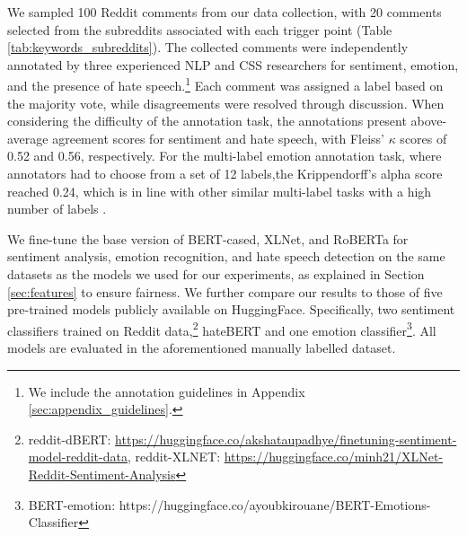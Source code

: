 We sampled 100 Reddit comments from our data collection, with 20 comments selected from the subreddits associated with each trigger point (Table \ref{tab:keywords_subreddits}). %
The collected comments were independently annotated by three experienced NLP and CSS researchers for sentiment, emotion, and the presence of hate speech.\footnote{We include the annotation guidelines in Appendix \ref{sec:appendix_guidelines}.} Each comment was assigned a label based on the majority vote, while disagreements were resolved through discussion. When considering the difficulty of the annotation task, the annotations present above-average agreement scores for sentiment and hate speech, with Fleiss' $\kappa$ scores of 0.52 and 0.56, respectively. For the multi-label emotion annotation task, where annotators had to choose from a set of 12 labels,the Krippendorff’s alpha score \cite{krippendorff2011computing} reached 0.24, which is in line with other similar multi-label tasks with a high number of labels \cite{mohammad2018semeval,antypas2022twitter,ousidhoum-etal-2019-multilingual}.

We fine-tune the base version of BERT-cased, XLNet, and RoBERTa for sentiment analysis, emotion recognition, and hate speech detection on the same datasets as the models we used for our experiments, as explained in Section \ref{sec:features} \cite{rosenthal2017semeval,mohammad2018semeval,antypas2023robust} to ensure fairness.
We further compare our results to those of five pre-trained models publicly available on HuggingFace. Specifically, two sentiment classifiers trained on Reddit data,\footnote{ reddit-dBERT: \url{https://huggingface.co/akshataupadhye/finetuning-sentiment-model-reddit-data}, reddit-XLNET: \url{https://huggingface.co/minh21/XLNet-Reddit-Sentiment-Analysis} } hateBERT \cite{caselli-etal-2021-hatebert2} and one emotion classifier\footnote{BERT-emotion: https://huggingface.co/ayoubkirouane/BERT-Emotions-Classifier}. All models are evaluated in the aforementioned manually labelled dataset.

